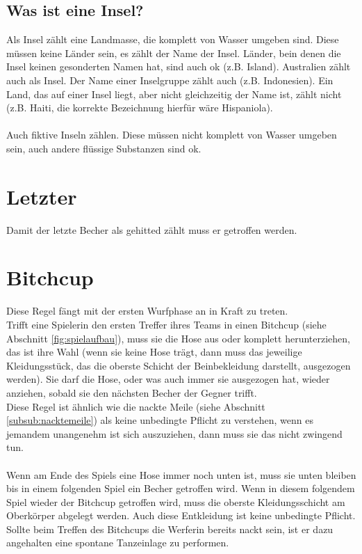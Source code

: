 \documentclass[a5paper, 12pt]{book}
\begin{document}
\subsection{Was ist eine Insel?}\label{sub:wasistinsel}
Als Insel zählt eine Landmasse, die komplett von Wasser umgeben sind. Diese müssen keine Länder sein, es zählt der Name der Insel. Länder, bein denen die Insel keinen gesonderten Namen hat, sind auch ok (z.B. Island). Australien zählt auch als Insel. Der Name einer Inselgruppe zählt auch (z.B. Indonesien). Ein Land, das auf einer Insel liegt, aber nicht gleichzeitig der Name ist, zählt nicht (z.B. Haiti, die korrekte Bezeichnung hierfür wäre Hispaniola).\\\\
Auch fiktive Inseln zählen. Diese müssen nicht komplett von Wasser umgeben sein, auch andere flüssige Substanzen sind ok. 
\section{Letzter}\label{sec:letzter}
Damit der letzte Becher als gehitted zählt muss er getroffen werden. 
\section{Bitchcup}\label{sec:bitchcup}
Diese Regel fängt mit der ersten Wurfphase an in Kraft zu treten.\\Trifft eine Spielerin den ersten Treffer ihres Teams in einen Bitchcup (siehe Abschnitt \ref{fig:spielaufbau}), muss sie die Hose aus oder komplett herunterziehen, das ist ihre Wahl (wenn sie keine Hose trägt, dann muss das jeweilige Kleidungsstück, das die oberste Schicht der Beinbekleidung darstellt, ausgezogen werden). Sie darf die Hose, oder was auch immer sie ausgezogen hat, wieder anziehen, sobald sie den nächsten Becher der Gegner trifft. \\
Diese Regel ist ähnlich wie die nackte Meile (siehe Abschnitt \ref{subsub:nacktemeile}) als keine unbedingte Pflicht zu verstehen, wenn es jemandem unangenehm ist sich auszuziehen, dann muss sie das nicht zwingend tun.\\\\
Wenn am Ende des Spiels eine Hose immer noch unten ist, muss sie unten bleiben bis in einem folgenden Spiel ein Becher getroffen wird. Wenn in diesem folgendem Spiel wieder der Bitchcup getroffen wird, muss die oberste Kleidungsschicht am Oberkörper abgelegt werden. Auch diese Entkleidung ist keine unbedingte Pflicht.\\
Sollte beim Treffen des Bitchcups die Werferin bereits nackt sein, ist er dazu angehalten eine spontane Tanzeinlage zu performen.
\end{document}
